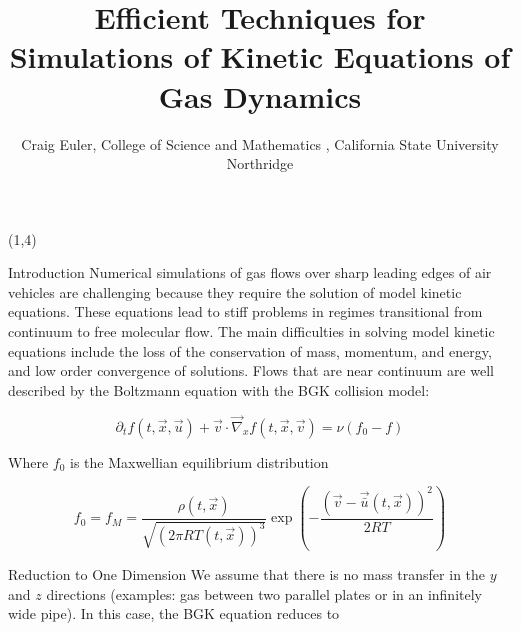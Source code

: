 \documentclass[unknownkeysallowed,final]{beamer}
\title{\normalsize{Efficient Techniques for Simulations of Kinetic Equations of Gas Dynamics}}
\author{\small{Craig Euler, \hspace{5mm} College of Science and Mathematics ,\hspace{5mm} California State University Northridge}}
\date{}
\begin{document}
\tiny{}
\begin{frame}{} 
	
	


	\begin{textblock}{19.5}(1,4)

\begin{block}{\small{Introduction}}
Numerical simulations of gas flows over sharp leading edges of air vehicles are challenging because they require the solution of model kinetic equations. These equations lead to stiff problems in regimes transitional from continuum to free molecular flow. The main difficulties in solving model kinetic equations include the loss of the conservation of mass, momentum, and energy, and low order convergence of solutions. Flows that are near continuum are well described by the Boltzmann equation with the BGK collision model:

\begin{equation*}
\label{ES-BGK}
\partial_{t} f(t, \vec{x}, \vec{u}) + \vec{v} \cdot \vec{\nabla}_{x} f(t, \vec{x}, \vec{v}) = \nu (f_{0} - f)
\end{equation*}

Where $f_{0}$ is the Maxwellian equilibrium distribution

\begin{equation*}
\label{f0}
f_{0} = f_{M} = \frac{\rho(t, \vec{x})}{\sqrt{(2 \pi RT(t, \vec{x}))^{3}}} \exp \left( -\frac{( \vec{v}- \vec{\bar{u}}(t, \vec{x}))^{2}}{2RT} \right)
\end{equation*}

\end{block}

\begin{block}{\small{Reduction to One Dimension}}
We assume that there is no mass transfer in the $y$ and $z$ directions (examples: gas between two parallel plates or in an infinitely wide pipe). In this case, the BGK equation reduces to




\end{block}
\end{textblock}
\end{frame}
\end{document}
